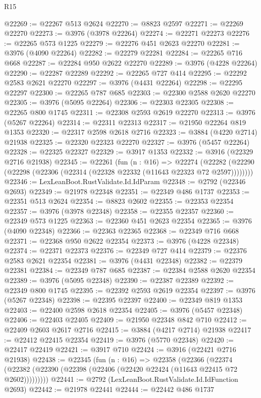 \begin{lexlean}{R15}
\begin{coremodule}
@22269 := @22267 @513 @2624
@22270 := @8823 @2597
@22271 := @22269 @22270
@22273 := @3976 (@3978 @22264)
@22274 := @22271 @22273
@22276 := @22265 @573 @1225
@22279 := @22276 @451 @2623 @22270
@22281 := @3976 (@4090 @22264)
@22282 := @22279 @22281
@22284 := @22265 @716 @668
@22287 := @22284 @950 @2622 @22270
@22289 := @3976 (@4228 @22264)
@22290 := @22287 @22289
@22292 := @22265 @727 @414
@22295 := @22292 @2583 @2621 @22270
@22297 := @3976 (@4431 @22264)
@22298 := @22295 @22297
@22300 := @22265 @787 @685
@22303 := @22300 @2588 @2620 @22270
@22305 := @3976 (@5095 @22264)
@22306 := @22303 @22305
@22308 := @22265 @800 @1745
@22311 := @22308 @2593 @2619 @22270
@22313 := @3976 (@5267 @22264)
@22314 := @22311 @22313
@22317 := @21950 @22264 @819 @1353
@22320 := @22317 @2598 @2618 @2716
@22323 := @3884 (@4220 @2714) @21938
@22325 := @22320 @22323 @22270
@22327 := @3976 (@5457 @22264)
@22328 := @22325 @22327
@22329 := @3917 @1353
@22332 := @3916 (@22329 @2716 @21938)
@22345 := @22261
    (fun (n : @16) =>
    @22274 (@22282 (@22290 (@22298 (@22306 (@22314 (@22328 @22332 (@11643 @22323 @72 @2597))))))))
@22346 := LexLeanBoot.RustValidate.Id.IdParam
@22348 := @2792 (@22346 @2693)
@22349 := @21978 @22348
@22351 := @22349 @486 @1737
@22353 := @22351 @513 @2624
@22354 := @8823 @2602
@22355 := @22353 @22354
@22357 := @3976 (@3978 @22348)
@22358 := @22355 @22357
@22360 := @22349 @573 @1225
@22363 := @22360 @451 @2623 @22354
@22365 := @3976 (@4090 @22348)
@22366 := @22363 @22365
@22368 := @22349 @716 @668
@22371 := @22368 @950 @2622 @22354
@22373 := @3976 (@4228 @22348)
@22374 := @22371 @22373
@22376 := @22349 @727 @414
@22379 := @22376 @2583 @2621 @22354
@22381 := @3976 (@4431 @22348)
@22382 := @22379 @22381
@22384 := @22349 @787 @685
@22387 := @22384 @2588 @2620 @22354
@22389 := @3976 (@5095 @22348)
@22390 := @22387 @22389
@22392 := @22349 @800 @1745
@22395 := @22392 @2593 @2619 @22354
@22397 := @3976 (@5267 @22348)
@22398 := @22395 @22397
@22400 := @22349 @819 @1353
@22403 := @22400 @2598 @2618 @22354
@22405 := @3976 (@5457 @22348)
@22406 := @22403 @22405
@22409 := @21950 @22348 @842 @710
@22412 := @22409 @2603 @2617 @2716
@22415 := @3884 (@4217 @2714) @21938
@22417 := @22412 @22415 @22354
@22419 := @3976 (@5770 @22348)
@22420 := @22417 @22419
@22421 := @3917 @710
@22424 := @3916 (@22421 @2716 @21938)
@22438 := @22345
    (fun (n : @16) =>
    @22358
      (@22366
        (@22374 (@22382 (@22390 (@22398 (@22406 (@22420 @22424 (@11643 @22415 @72 @2602)))))))))
@22441 := @2792 (LexLeanBoot.RustValidate.Id.IdFunction @2693)
@22442 := @21978 @22441
@22444 := @22442 @486 @1737

\end{coremodule}
\end{lexlean}
